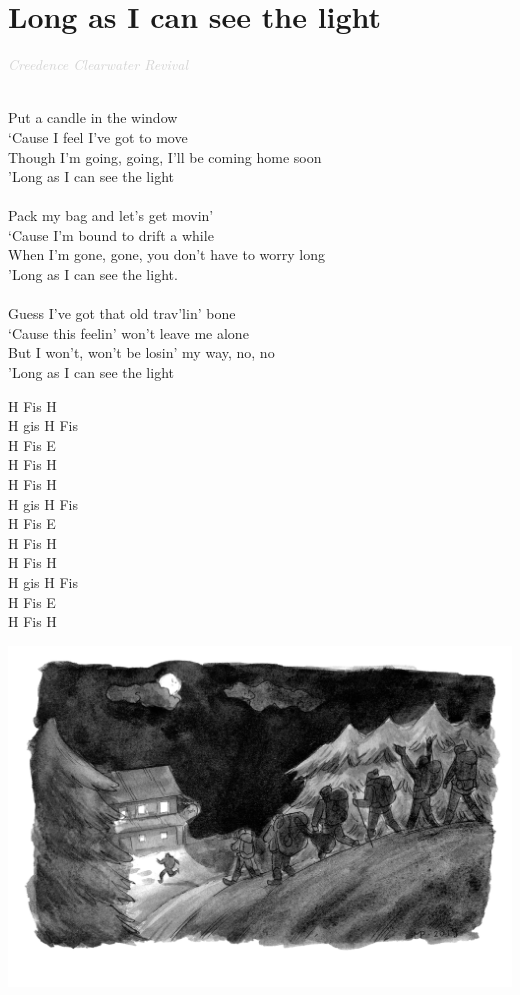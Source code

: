 \documentclass[a5paper, 10pt]{book}
\begin{document}
\section{Long as I can see the light}\textcolor{lightgray}{\textit{Creedence Clearwater Revival}}\\~\\
\begin{minipage}[t]{0.8\textwidth}
  Put a candle in the window\\
  ‘Cause I feel I've got to move\\
  Though I'm going, going, I'll be coming home soon\\
  'Long as I can see the light\\
  \\
  Pack my bag and let's get movin'\\
  ‘Cause I'm bound to drift a while\\
  When I'm gone, gone, you don't have to worry long\\
  'Long as I can see the light.\\
  \\
  Guess I've got that old trav'lin' bone\\
  ‘Cause this feelin' won't leave me alone\\
  But I won't, won't be losin' my way, no, no\\
  'Long as I can see the light\\
\end{minipage}
\begin{minipage}[t]{0.2\textwidth}
  H Fis H\\
  H gis H Fis\\
  H Fis E\\
  H Fis H\\

  H Fis H\\
  H gis H Fis\\
  H Fis E\\
  H Fis H\\

  H Fis H\\
  H gis H Fis\\
  H Fis E\\
  H Fis H\\
\end{minipage}
\vfill
\includegraphics[width=\textwidth, center]{images/long_as_i_can_see_the_light.png}\\
\end{document}
